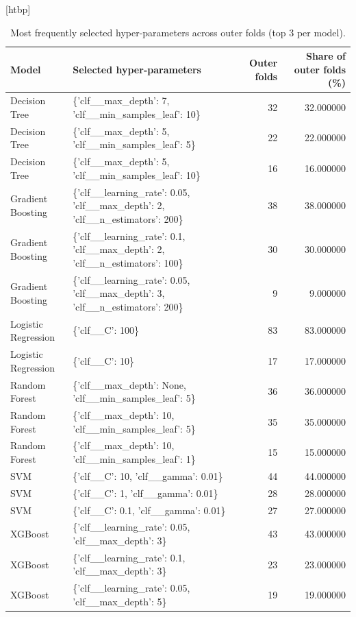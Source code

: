 \begin{table}
\small[htbp]
\caption{Most frequently selected hyper-parameters across outer folds (top 3 per model).}
\label{tab:P07_param_frequency}
\begin{tabular}{llrr}
\toprule
Model & Selected hyper-parameters & Outer folds & Share of outer folds (\%) \\
\midrule
Decision Tree & \{'clf\_\_max\_depth': 7, 'clf\_\_min\_samples\_leaf': 10\} & 32 & 32.000000 \\
Decision Tree & \{'clf\_\_max\_depth': 5, 'clf\_\_min\_samples\_leaf': 5\} & 22 & 22.000000 \\
Decision Tree & \{'clf\_\_max\_depth': 5, 'clf\_\_min\_samples\_leaf': 10\} & 16 & 16.000000 \\
Gradient Boosting & \{'clf\_\_learning\_rate': 0.05, 'clf\_\_max\_depth': 2, 'clf\_\_n\_estimators': 200\} & 38 & 38.000000 \\
Gradient Boosting & \{'clf\_\_learning\_rate': 0.1, 'clf\_\_max\_depth': 2, 'clf\_\_n\_estimators': 100\} & 30 & 30.000000 \\
Gradient Boosting & \{'clf\_\_learning\_rate': 0.05, 'clf\_\_max\_depth': 3, 'clf\_\_n\_estimators': 200\} & 9 & 9.000000 \\
Logistic Regression & \{'clf\_\_C': 100\} & 83 & 83.000000 \\
Logistic Regression & \{'clf\_\_C': 10\} & 17 & 17.000000 \\
Random Forest & \{'clf\_\_max\_depth': None, 'clf\_\_min\_samples\_leaf': 5\} & 36 & 36.000000 \\
Random Forest & \{'clf\_\_max\_depth': 10, 'clf\_\_min\_samples\_leaf': 5\} & 35 & 35.000000 \\
Random Forest & \{'clf\_\_max\_depth': 10, 'clf\_\_min\_samples\_leaf': 1\} & 15 & 15.000000 \\
SVM & \{'clf\_\_C': 10, 'clf\_\_gamma': 0.01\} & 44 & 44.000000 \\
SVM & \{'clf\_\_C': 1, 'clf\_\_gamma': 0.01\} & 28 & 28.000000 \\
SVM & \{'clf\_\_C': 0.1, 'clf\_\_gamma': 0.01\} & 27 & 27.000000 \\
XGBoost & \{'clf\_\_learning\_rate': 0.05, 'clf\_\_max\_depth': 3\} & 43 & 43.000000 \\
XGBoost & \{'clf\_\_learning\_rate': 0.1, 'clf\_\_max\_depth': 3\} & 23 & 23.000000 \\
XGBoost & \{'clf\_\_learning\_rate': 0.05, 'clf\_\_max\_depth': 5\} & 19 & 19.000000 \\
\bottomrule
\end{tabular}
\end{table}
